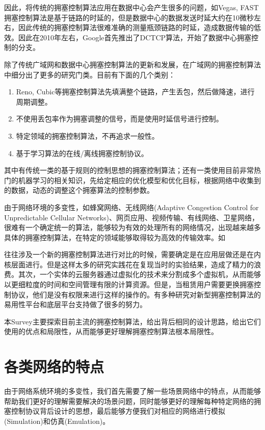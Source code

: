 \documentclass[a4paper, 12pt, UTF8]{ctexart}
\begin{document}
\par 因此，将传统的拥塞控制算法应用在数据中心会产生很多的问题，如Vegas, FAST拥塞控制算法是基于链路的时延的，但是数据中心的数据发送时延大约在10微秒左右，因此传统的拥塞控制算法很难准确的测量瓶颈链路的时延，造成数据传输的低效。因此在2010年左右，Google首先推出了DCTCP算法，开始了数据中心拥塞控制的分支。

\par 除了传统广域网和数据中心拥塞控制算法的更新和发展，在广域网的拥塞控制算法中细分出了更多的研究门类。目前有下面的几个类别：
\begin{enumerate}
	\item Reno, Cubic等拥塞控制算法先填满整个链路，产生丢包，然后做降速，进行周期调整。
	\item 不使用丢包率作为拥塞调整的信号，而是使用时延信号进行控制。
	\item 特定领域的拥塞控制算法，不再追求一般性。
	\item 基于学习算法的在线/离线拥塞控制协议。
\end{enumerate}
\par 其中有传统一类的基于规则的控制思想的拥塞控制算法；还有一类使用目前非常热门的机器学习的相关知识，先给定相应的优化模型和优化目标，根据网络中收集到的数据，动态的调整这个拥塞算法的控制参数。

\par 由于网络环境的多变性，如蜂窝网络、无线网络(Adaptive Congestion Control for Unpredictable Cellular Networks)、网页应用、视频传输、有线网络、卫星网络，很难有一个确定统一的算法，能够较为有效的处理所有的网络情况，出现越来越多具体的拥塞控制算法，在特定的领域能够取得较为高效的传输效率。如

往往涉及一个新的拥塞控制算法进行对比的时候，需要确定是在应用层做还是在内核层面进行。但是这样太多的研究实践花在复现当时的实验结果，造成了精力的浪费。其次，一个实体的云服务器通过虚拟化的技术来分割成多个虚拟机，从而能够以更细粒度的时间和空间管理有限的计算资源。但是，当租赁用户需要更换拥塞控制协议，他们是没有权限\cite{DBLP:conf/sigcomm/HeRAGFCA16}来进行这样的操作的。有多种研究对新型拥塞控制算法的易用性平台和底层平台\cite{DBLP:conf/usenix/YanMHRWLW18}支持做了很多的努力。

\par 本Survey主要探索目前主流的拥塞控制算法，给出背后相同的设计思路，给出它们使用的优点和局限性，从而能够更好理解拥塞控制算法根本局限性。

\clearpage

\section{各类网络的特点}
\par 由于网络系统环境的多变性，我们首先需要了解一些场景网络中的特点，从而能够帮助我们更好的理解需要解决的场景问题，同时能够更好的理解每种特定网络的拥塞控制协议背后设计的思想，最后能够方便我们对相应的网络进行模拟(Simulation)和仿真(Emulation)。
\end{document}
